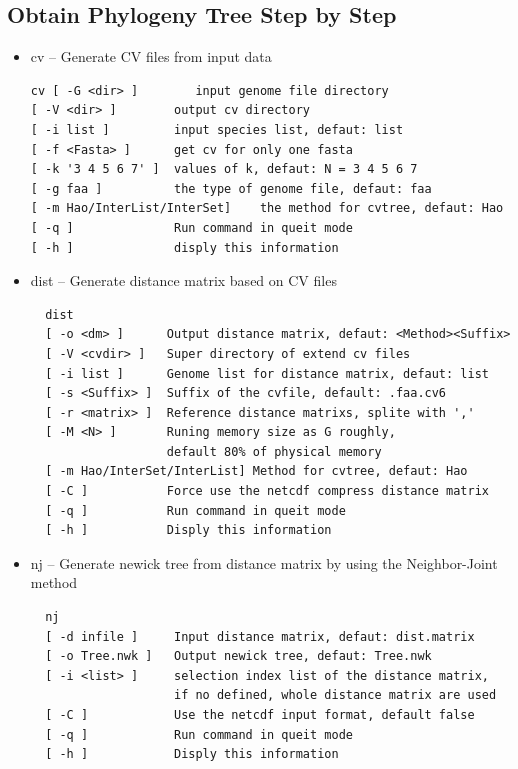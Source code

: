 \documentclass[a4paper,12pt]{article}
\begin{document}
\subsection{Obtain Phylogeny Tree Step by Step}
\begin{itemize}\itemsep 0pt
  \item cv -- Generate CV files from input data
\begin{verbatim}
cv [ -G <dir> ]        input genome file directory
[ -V <dir> ]        output cv directory
[ -i list ]         input species list, defaut: list
[ -f <Fasta> ]      get cv for only one fasta
[ -k '3 4 5 6 7' ]  values of k, defaut: N = 3 4 5 6 7
[ -g faa ]          the type of genome file, defaut: faa
[ -m Hao/InterList/InterSet]    the method for cvtree, defaut: Hao
[ -q ]              Run command in queit mode
[ -h ]              disply this information
\end{verbatim}

  \item dist -- Generate distance matrix based on CV files
\begin{verbatim}
  dist
  [ -o <dm> ]      Output distance matrix, defaut: <Method><Suffix>
  [ -V <cvdir> ]   Super directory of extend cv files
  [ -i list ]      Genome list for distance matrix, defaut: list
  [ -s <Suffix> ]  Suffix of the cvfile, default: .faa.cv6
  [ -r <matrix> ]  Reference distance matrixs, splite with ','
  [ -M <N> ]       Runing memory size as G roughly,
                   default 80% of physical memory
  [ -m Hao/InterSet/InterList] Method for cvtree, defaut: Hao
  [ -C ]           Force use the netcdf compress distance matrix
  [ -q ]           Run command in queit mode
  [ -h ]           Disply this information
\end{verbatim}

\item nj -- Generate newick tree from distance matrix by using the Neighbor-Joint method
\begin{verbatim}
  nj
  [ -d infile ]     Input distance matrix, defaut: dist.matrix
  [ -o Tree.nwk ]   Output newick tree, defaut: Tree.nwk
  [ -i <list> ]     selection index list of the distance matrix,
                    if no defined, whole distance matrix are used
  [ -C ]            Use the netcdf input format, default false
  [ -q ]            Run command in queit mode
  [ -h ]            Disply this information
\end{verbatim}
\end{itemize}
\end{document}
